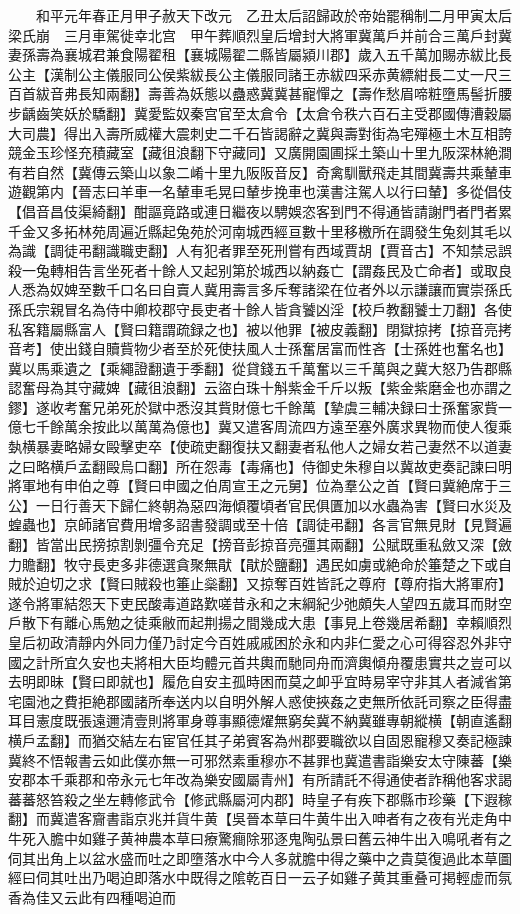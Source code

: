 　　和平元年春正月甲子赦天下改元　乙丑太后詔歸政於帝始罷稱制二月甲寅太后梁氏崩　三月車駕徙幸北宫　甲午葬順烈皇后增封大將軍冀萬戶并前合三萬戶封冀妻孫壽為襄城君兼食陽翟租【襄城陽翟二縣皆屬潁川郡】歲入五千萬加賜赤紱比長公主【漢制公主儀服同公侯紫紱長公主儀服同諸王赤紱四采赤黄縹紺長二丈一尺三百首紱音弗長知兩翻】壽善為妖態以蠱惑冀冀甚寵憚之【壽作愁眉啼粧墮馬髻折腰步齲齒笑妖於驕翻】冀愛監奴秦宫官至太倉令【太倉令秩六百石主受郡國傳漕穀屬大司農】得出入壽所威權大震刺史二千石皆謁辭之冀與壽對街為宅殫極土木互相誇競金玉珍怪充積藏室【藏徂浪翻下守藏同】又廣開園圃採土築山十里九阪深林絶澗有若自然【冀傳云築山以象二崤十里九阪阪音反】奇禽馴獸飛走其間冀壽共乘輦車遊觀第内【晉志曰羊車一名輦車毛晃曰輦步挽車也漢書注駕人以行曰輦】多從倡伎【倡音昌伎渠綺翻】酣謳竟路或連日繼夜以騁娛恣客到門不得通皆請謝門者門者累千金又多拓林苑周遍近縣起兔苑於河南城西經亘數十里移檄所在調發生兔刻其毛以為識【調徒弔翻識職吏翻】人有犯者罪至死刑嘗有西域賈胡【賈音古】不知禁忌誤殺一兔轉相告言坐死者十餘人又起别第於城西以納姦亡【謂姦民及亡命者】或取良人悉為奴婢至數千口名曰自賣人冀用壽言多斥奪諸梁在位者外以示謙讓而實崇孫氏孫氏宗親冒名為侍中卿校郡守長吏者十餘人皆貪饕凶淫【校戶教翻饕士刀翻】各使私客籍屬縣富人【賢曰籍謂疏録之也】被以他罪【被皮義翻】閉獄掠拷【掠音亮拷音考】使出錢自贖貲物少者至於死使扶風人士孫奮居富而性吝【士孫姓也奮名也】冀以馬乘遺之【乘繩證翻遺于季翻】從貸錢五千萬奮以三千萬與之冀大怒乃告郡縣認奮母為其守藏婢【藏徂浪翻】云盜白珠十斛紫金千斤以叛【紫金紫磨金也亦謂之鏐】遂收考奮兄弟死於獄中悉沒其貲財億七千餘萬【摯虞三輔决録曰士孫奮家貲一億七千餘萬余按此以萬萬為億也】冀又遣客周流四方遠至塞外廣求異物而使人復乘埶横暴妻略婦女毆擊吏卒【使疏吏翻復扶又翻妻者私他人之婦女若己妻然不以道妻之曰略横戶孟翻毆烏口翻】所在怨毒【毒痛也】侍御史朱穆自以冀故吏奏記諫曰明將軍地有申伯之尊【賢曰申國之伯周宣王之元舅】位為羣公之首【賢曰冀絶席于三公】一日行善天下歸仁終朝為惡四海傾覆頃者官民俱匱加以水蟲為害【賢曰水災及蝗蟲也】京師諸官費用增多詔書發調或至十倍【調徒弔翻】各言官無見財【見賢遍翻】皆當出民搒掠割剝彊令充足【搒音彭掠音亮彊其兩翻】公賦既重私斂又深【斂力贍翻】牧守長吏多非德選貪聚無猒【猒於鹽翻】遇民如虜或絶命於箠楚之下或自賊於迫切之求【賢曰賊殺也箠止橤翻】又掠奪百姓皆託之尊府【尊府指大將軍府】遂令將軍結怨天下吏民酸毒道路歎嗟昔永和之末綱紀少弛頗失人望四五歲耳而財空戶散下有離心馬勉之徒乘敝而起荆揚之間幾成大患【事見上卷幾居希翻】幸賴順烈皇后初政清靜内外同力僅乃討定今百姓戚戚困於永和内非仁愛之心可得容忍外非守國之計所宜久安也夫將相大臣均體元首共輿而馳同舟而濟輿傾舟覆患實共之豈可以去明即昧【賢曰即就也】履危自安主孤時困而莫之卹乎宜時易宰守非其人者減省第宅園池之費拒絶郡國諸所奉送内以自明外解人惑使挾姦之吏無所依託司察之臣得盡耳目憲度既張遠邇清壹則將軍身尊事顯德燿無窮矣冀不納冀雖專朝縱横【朝直遙翻横戶孟翻】而猶交結左右宦官任其子弟賓客為州郡要職欲以自固恩寵穆又奏記極諫冀終不悟報書云如此僕亦無一可邪然素重穆亦不甚罪也冀遣書詣樂安太守陳蕃【樂安郡本千乘郡和帝永元七年改為樂安國屬青州】有所請託不得通使者詐稱他客求謁蕃蕃怒笞殺之坐左轉修武令【修武縣屬河内郡】時皇子有疾下郡縣市珍藥【下遐稼翻】而冀遣客齎書詣京兆并貨牛黄【吳晉本草曰牛黄牛出入呻者有之夜有光走角中牛死入膽中如雞子黄神農本草曰療驚癎除邪逐鬼陶弘景曰舊云神牛出入鳴吼者有之伺其出角上以盆水盛而吐之即墮落水中今人多就膽中得之藥中之貴莫復過此本草圖經曰伺其吐出乃喝迫即落水中既得之隂乾百日一云子如雞子黄其重叠可掲輕虚而氛香為佳又云此有四種喝迫而